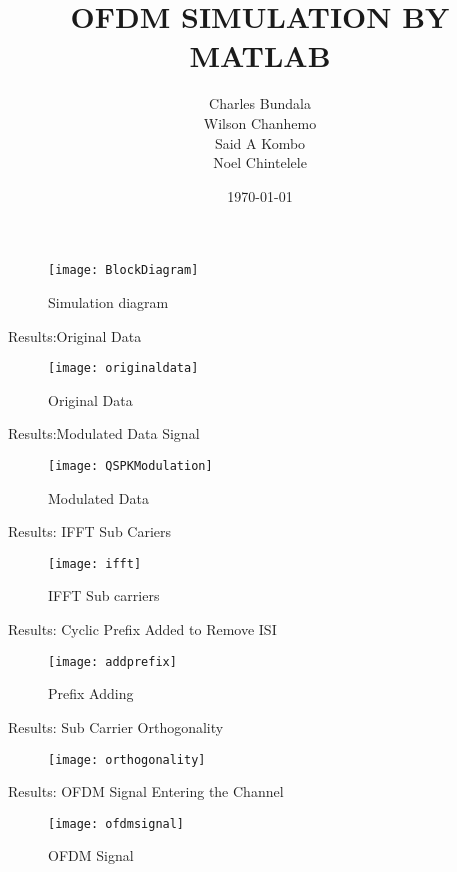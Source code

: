\documentclass[]{beamer}
\title{OFDM SIMULATION BY MATLAB}    %
\author{Charles Bundala\\Wilson Chanhemo\\Said A Kombo\\ Noel Chintelele}                 %
\institute{University of Dodoma}      %
\date{\today}
\begin{document}
\begin{frame}
 \titlepage
\end{frame}     %
\begin{figure}
\centering
\texttt{[image: BlockDiagram]}
\caption{Simulation diagram}
\label{fig:BlockDiagram}
\end{figure}

\begin{frame}{Results:Original Data}
	\begin{figure}
\centering
\texttt{[image: originaldata]}
\caption{Original Data}
\label{fig:originaldata}
\end{figure}
	
\end{frame}
\begin{frame}{Results:Modulated Data Signal}
	\begin{figure}
\centering
\texttt{[image: QSPKModulation]}
\caption{Modulated Data}
\label{fig:QSPKModulation}
\end{figure}

\end{frame}
\begin{frame}{Results: IFFT Sub Cariers}
\begin{figure}
\centering
\texttt{[image: ifft]}
\caption{IFFT Sub carriers}
\label{fig:ifft}
\end{figure}

\end{frame}
\begin{frame}{Results: Cyclic Prefix Added to Remove ISI}
	\begin{figure}
\centering
\texttt{[image: addprefix]}
\caption{Prefix Adding}
\label{fig:addprefix}
\end{figure}
\end{frame}
\begin{frame}{Results: Sub Carrier Orthogonality}
\begin{figure}
\centering
\texttt{[image: orthogonality]}
\caption{}
\label{fig:orthogonality}
\end{figure}	
\end{frame}
\begin{frame}{Results: OFDM Signal Entering the Channel}
\begin{figure}
\centering
\texttt{[image: ofdmsignal]}
\caption{OFDM Signal}
\label{fig:ofdmsignal}
\end{figure}
\end{frame}
\end{document}
